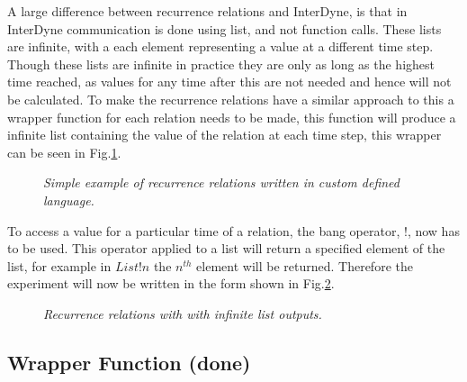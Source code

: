 \documentclass{article}
\begin{document}
A large difference between recurrence relations and InterDyne, is that in InterDyne communication is done using list, and not function calls. These lists are infinite, with a each element representing a value at a different time step. Though these lists are infinite in practice they are only as long as the highest time reached, as values for any time after this are not needed and hence will not be calculated. To make the recurrence relations have a similar approach to this a wrapper function for each relation needs to be made, this function will produce a infinite list containing the value of the relation at each time step, this wrapper can be seen in Fig.\ref{fig:iloc}. 
\begin{figure}[H]
	\centering
	
	\caption{\it Simple example of recurrence relations written in custom defined language.}
	\label{fig:iloc}
\end{figure} 
To access a value for a particular time of a relation, the bang operator, !, now has to be used. This operator applied to a list will return a specified element of the list, for example in $List!n$ the $n^{th}$ element will be returned. 
Therefore the experiment will now be written in the form shown in Fig.\ref{fig:RRiloc}. 
\begin{figure}[H]
	\centering
	
	\caption{\it Recurrence relations with with infinite list outputs.}
	\label{fig:RRiloc}
\end{figure} 
       
\subsection{Wrapper Function (done)}


\end{document}

